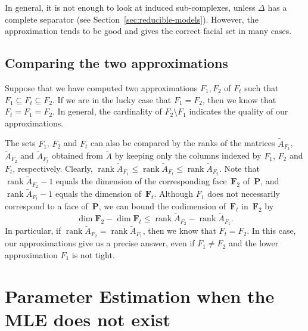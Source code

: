 \documentclass[aos,noinfoline]{imsart}
\DeclareMathOperator{\rank}{rank}
\newcommand{\Fbf}{\mathbf{F}}
\newcommand{\Pbf}{\mathbf{P}}
\theoremstyle{remark}
\theoremstyle{definition}
\begin{document}
In general, it is not enough to look at induced sub-complexes, unless $\Delta$ has a complete separator (see
Section~\ref{sec:reducible-models}).  However, the approximation tends to be good and gives the correct facial set in
many cases.

\subsection{Comparing the two approximations}
\label{sec:comparing-approximations}

Suppose that we have computed two approximations $F_{1},F_{2}$ of $F_{t}$ such that $F_{1}\subseteq F_{t}\subseteq
F_{2}$.  If we are in the lucky case that $F_{1}=F_{2}$, then we know that $F_{t}=F_{1}=F_{2}$.  In general, the
cardinality of $F_{2}\setminus F_{1}$ indicates the quality of our approximations.

The sets $F_{1}$, $F_{2}$ and $F_{t}$ can also be compared by the ranks of the matrices $\tilde A_{F_1}$, $\tilde A_{F_2}$ and
$\tilde A_{F_{t}}$ obtained from $ \tilde{A}$ by keeping only the columns indexed by $F_1$, $F_2$ and $F_{t}$,
respectively.  Clearly, $\rank\tilde A_{F_{1}}\le\rank\tilde A_{F_{t}}\le\rank\tilde A_{F_{2}}$.  Note that
$\rank\tilde A_{F_{2}}-1$ equals the dimension of the corresponding face~$\Fbf_{2}$ of~$\Pbf$, and $\rank \tilde{A}_{F_{t}}-1$
equals the dimension of~$\Fbf_{t}$.
Although $F_{1}$ does not necessarily correspond to a face of~$\Pbf$, we
can bound the codimension of~$\Fbf_{t}$ in~$\Fbf_{2}$ by
\begin{equation*}
  \dim\Fbf_{2}-\dim\Fbf_{t} \le \rank\tilde A_{F_{2}}-\rank\tilde A_{F_{1}}.
\end{equation*}
In particular, if $\rank\tilde A_{F_{2}}=\rank\tilde A_{F_{1}}$, then we know that $F_{t}=F_{2}$.  In this case, our approximations
give us a precise answer, even if $F_{1}\neq F_{2}$ and the lower approximation $F_{1}$ is not tight.

\section{Parameter Estimation when the MLE does not exist}
\label{sec:parameter-estimation}
\end{document}

